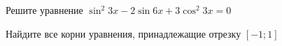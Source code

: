 \begin{ex}
	\begin{condition}
		\begin{enumcols}[label=\asbuk*)]
			\item Решите уравнение \( \sin^2 3x -2\sin 6x +3\cos^2 3x = 0 \)
			\item Найдите все корни уравнения, принадлежащие отрезку \( \left[-1;1\right] \)
		\end{enumcols}
	\end{condition}
\end{ex}